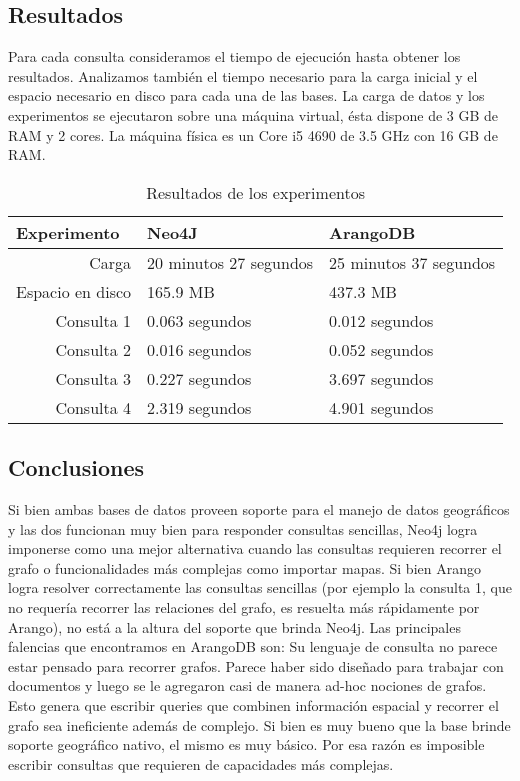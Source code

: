 \documentclass{llncs}
\begin{document}
\subsection{Resultados}
Para cada consulta consideramos el tiempo de ejecución hasta obtener los resultados. Analizamos también el tiempo necesario para la carga inicial y el espacio necesario en disco para cada una de las bases. La carga de datos y los experimentos se ejecutaron sobre una máquina virtual, ésta dispone de 3 GB de RAM y 2 cores. La máquina física es un Core i5 4690 de 3.5 GHz con 16 GB de RAM.
\begin{table}
\caption{Resultados de los experimentos}
\begin{center}
\begin{tabular}{r@{\quad}ll}%
\hline
\multicolumn{1}{l}{Experimento}&\multicolumn{1}{l}{Neo4J}&\multicolumn{1}{l}{ArangoDB}\\
\hline\rule{0pt}{12pt}
Carga & 20 minutos 27 segundos & 25 minutos 37 segundos \\
Espacio en disco & 165.9 MB & 437.3 MB \\
Consulta 1 & 0.063 segundos & 0.012 segundos \\
Consulta 2 & 0.016 segundos & 0.052 segundos \\
Consulta 3 & 0.227 segundos & 3.697 segundos \\
Consulta 4 & 2.319 segundos & 4.901 segundos \\
\hline
\end{tabular}
\end{center}
\end{table}

\subsection{Conclusiones}

Si bien ambas bases de datos proveen soporte para el manejo de datos geográficos y las dos funcionan muy bien para responder consultas sencillas, Neo4j logra imponerse como una mejor alternativa cuando las consultas requieren recorrer el grafo o funcionalidades más complejas como importar mapas.
Si bien Arango logra resolver correctamente las consultas sencillas (por ejemplo la consulta 1, que no requería recorrer las relaciones del grafo, es resuelta más rápidamente por Arango), no está a la altura del soporte que brinda Neo4j.
Las principales falencias que encontramos en ArangoDB son:
Su lenguaje de consulta no parece estar pensado para recorrer grafos. Parece haber sido diseñado para trabajar con documentos y luego se le agregaron casi de manera ad-hoc nociones de grafos. Esto genera que escribir queries que combinen información espacial y recorrer el grafo sea ineficiente además de complejo.
Si bien es muy bueno que la base brinde soporte geográfico nativo, el mismo es muy básico. Por esa razón es imposible escribir consultas que requieren de capacidades más complejas.
 
\end{document}
